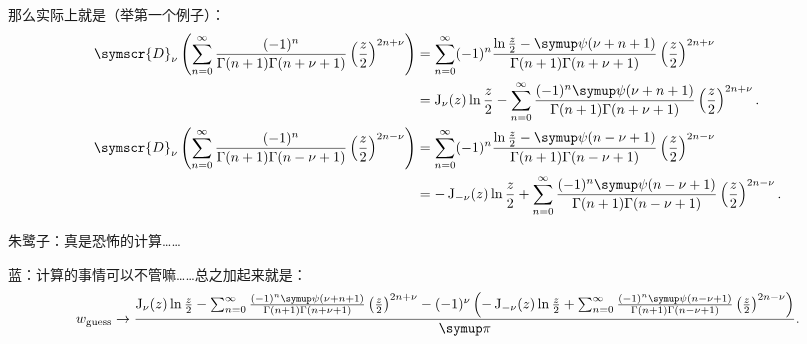 那么实际上就是（举第一个例子）：
\[
	\begin{aligned}
		\symscr{D} _ \nu\left(  \sum_{n=0}^{\infty} \frac{(-1)^n}{\Gamma (n+1)\Gamma (n+\nu +1)} \left( \frac{z}{2} \right) ^{2n+\nu }\right)  & = \sum_{n=0}^{\infty} (-1)^n  \frac{\ln \frac{z}{2}-\symup \psi (\nu+n+1 )}{\Gamma (n+1)\Gamma (n+\nu +1)} \left( \frac{z}{2} \right) ^{2n+\nu }                        \\
		                                                                                                                                       & = \besselj_ {\nu } (z)\ln \frac{z}{2}-\sum_{n=0}^{\infty}  \frac{ (-1)^n\symup \psi (\nu+n+1 )}{\Gamma (n+1)\Gamma (n+\nu +1)} \left( \frac{z}{2} \right) ^{2n+\nu }.   \\
		\symscr{D} _ \nu\left(  \sum_{n=0 }^{\infty} \frac{(-1)^n}{\Gamma (n+1)\Gamma (n-\nu +1)} \left( \frac{z}{2} \right) ^{2n-\nu }\right) & = \sum_{n=0 }^{\infty} (-1)^n  \frac{\ln \frac{z}{2}-\symup \psi (n-\nu+1 )}{\Gamma (n+1)\Gamma (n-\nu +1)} \left( \frac{z}{2} \right) ^{2n-\nu }                       \\
		                                                                                                                                       & = -\besselj_ {-\nu } (z)\ln \frac{z}{2}+\sum_{n=0}^{\infty}  \frac{ (-1)^n\symup \psi (n-\nu+1 )}{\Gamma (n+1)\Gamma (n-\nu +1)} \left( \frac{z}{2} \right) ^{2n-\nu }.
	\end{aligned}
\]

朱鹭子：真是恐怖的计算……

蓝：计算的事情可以不管嘛……总之加起来就是：
\[w_{\rm guess}\to
	\dfrac{\besselj_ {\nu } (z)\ln \frac{z}{2}-\sum_{n=0}^{\infty}  \frac{ (-1)^n\symup \psi (\nu+n+1 )}{\Gamma (n+1)\Gamma (n+\nu +1)} \left( \frac{z}{2} \right) ^{2n+\nu }-(-1)^\nu \left( -\besselj_ {-\nu } (z)\ln \frac{z}{2}+\sum_{n=0 }^{\infty}  \frac{ (-1)^n\symup \psi (n-\nu+1 )}{\Gamma (n+1)\Gamma (n-\nu +1)} \left( \frac{z}{2} \right) ^{2n-\nu } \right) }{\symup \pi }
	.\]

